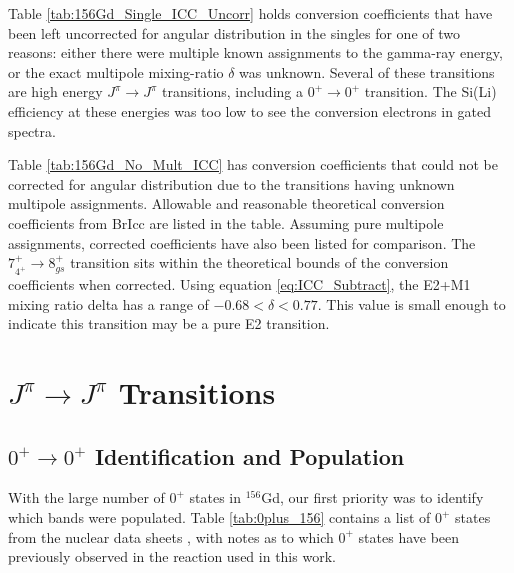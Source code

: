 \afterpage{\clearpage}

Table \ref{tab:156Gd_Single_ICC_Uncorr} holds conversion coefficients that have been left uncorrected for angular distribution in the singles for one of two reasons: either there were multiple known assignments to the gamma-ray energy, or the exact multipole mixing-ratio $\delta$ was unknown. Several of these transitions are high energy $J^\pi\rightarrow J^\pi$ transitions, including a $0^+\rightarrow0^+$ transition. The Si(Li) efficiency at these energies was too low to see the conversion electrons in gated spectra.

\afterpage{\clearpage}

Table \ref{tab:156Gd_No_Mult_ICC} has conversion coefficients that could not be corrected for angular distribution due to the transitions having unknown multipole assignments. Allowable and reasonable theoretical conversion coefficients from BrIcc\citep{kibedi08:_BRICC} are listed in the table. Assuming pure multipole assignments, corrected coefficients have also been listed for comparison. The $7^+_{4^+}\rightarrow 8^+_{gs}$ transition sits within the theoretical bounds of the conversion coefficients when corrected. Using equation \ref{eq:ICC_Subtract}, the E2+M1 mixing ratio delta has a range of $-0.68<\delta<0.77$. This value is small enough to indicate this transition may be a pure E2 transition. 

\afterpage{\clearpage}

\section{$J^{\pi}\rightarrow J^{\pi}$ Transitions}

\subsection{$0^{+}\rightarrow 0^{+}$ Identification and Population}

With the large number of $0^+$ states in $^{156}$Gd, our first priority was to identify which bands were populated. Table \ref{tab:0plus_156} contains a list of $0^+$ states from the nuclear data sheets \citep{reich12:_nds_156}, with notes as to which $0^+$ states have been previously observed in the reaction used in this work.



